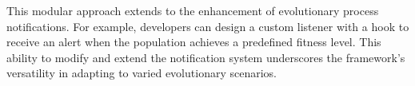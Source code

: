         This modular approach extends to the enhancement of evolutionary process notifications. For example, developers 
        can design a custom listener with a hook to receive an alert when the population achieves a predefined fitness 
        level. This ability to modify and extend the notification system underscores the framework's versatility in 
        adapting to varied evolutionary scenarios.
